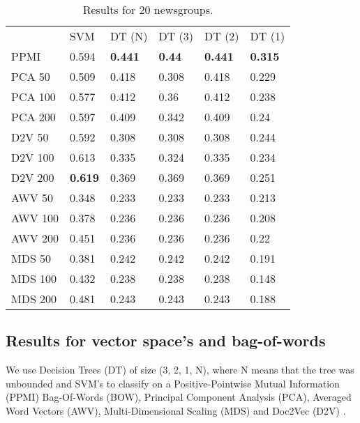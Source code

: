 \begin{table}[]
	\begin{tabular}{llllll}
		& SVM   & DT (N) & DT (3) & DT (2) & DT (1) \\
		PPMI           & 0.594 & \textbf{0.441}  & \textbf{0.44}   & \textbf{0.441}  & \textbf{0.315}  \\
		PCA 50         & 0.509 & 0.418  & 0.308  & 0.418  & 0.229  \\
		PCA 100        & 0.577 & 0.412  & 0.36   & 0.412  & 0.238  \\
		PCA 200        & 0.597 & 0.409  & 0.342  & 0.409  & 0.24   \\
		D2V 50         & 0.592 & 0.308  & 0.308  & 0.308  & 0.244  \\
		D2V 100        & 0.613 & 0.335  & 0.324  & 0.335  & 0.234  \\
		D2V 200        & \textbf{0.619} & 0.369  & 0.369  & 0.369  & 0.251  \\
		AWV 50         & 0.348 & 0.233  & 0.233  & 0.233  & 0.213  \\
		AWV 100        & 0.378 & 0.236  & 0.236  & 0.236  & 0.208  \\
		AWV 200        & 0.451 & 0.236  & 0.236  & 0.236  & 0.22   \\
		MDS 50         & 0.381 & 0.242  & 0.242  & 0.242  & 0.191  \\
		MDS 100        & 0.432 & 0.238  & 0.238  & 0.238  & 0.148  \\
		MDS 200        & 0.481 & 0.243  & 0.243  & 0.243  & 0.188 
	\end{tabular}
\caption{Results for 20 newsgroups.}
\label{table:Newsgroups}
\end{table}

\subsection{Results for vector space's and bag-of-words}
We use Decision Trees (DT) of size (3, 2, 1, N), where N means that the tree was unbounded and SVM's to classify on a Positive-Pointwise Mutual Information (PPMI) Bag-Of-Words (BOW), Principal Component Analysis (PCA), Averaged Word Vectors (AWV), Multi-Dimensional Scaling (MDS) and Doc2Vec (D2V) \cite{Le2014}. 

